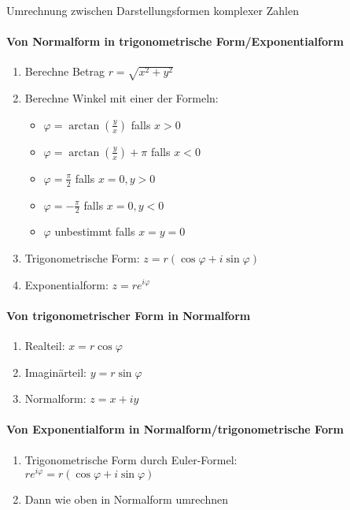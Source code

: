 \begin{KR}{Umrechnung zwischen Darstellungsformen komplexer Zahlen}
\paragraph{Von Normalform in trigonometrische Form/Exponentialform}
\begin{enumerate}
   \item Berechne Betrag $r = \sqrt{x^2 + y^2}$
   \item Berechne Winkel mit einer der Formeln: 
   \begin{itemize}
       \item $\varphi = \arctan(\frac{y}{x})$ falls $x > 0$
       \item $\varphi = \arctan(\frac{y}{x}) + \pi$ falls $x < 0$
       \item $\varphi = \frac{\pi}{2}$ falls $x = 0, y > 0$
       \item $\varphi = -\frac{\pi}{2}$ falls $x = 0, y < 0$
       \item $\varphi$ unbestimmt falls $x = y = 0$
   \end{itemize}
   \item Trigonometrische Form: $z = r(\cos\varphi + i\sin\varphi)$
   \item Exponentialform: $z = re^{i\varphi}$
\end{enumerate}

\paragraph{Von trigonometrischer Form in Normalform}
\begin{enumerate}
   \item Realteil: $x = r\cos\varphi$
   \item Imaginärteil: $y = r\sin\varphi$
   \item Normalform: $z = x + iy$
\end{enumerate}

\paragraph{Von Exponentialform in Normalform/trigonometrische Form}
\begin{enumerate}
   \item Trigonometrische Form durch Euler-Formel:\\
   $re^{i\varphi} = r(\cos\varphi + i\sin\varphi)$
   \item Dann wie oben in Normalform umrechnen
\end{enumerate}


\end{KR}
